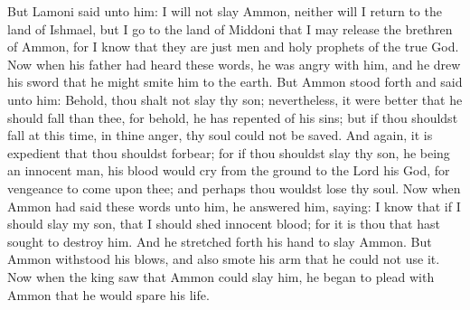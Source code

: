 But Lamoni said unto him: I will not slay Ammon, neither will I return to the land of Ishmael, but I go to the land of Middoni that I may release the brethren of Ammon, for I know that they are just men and holy prophets of the true God.
\bverse \iffalse Now when his father had heard these words, he was angry with him, and he drew his sword that he might smite him to the earth. \fi
Now when his father had heard these words, he was angry with him, and he drew his sword that he might smite him to the earth.
\bverse \iffalse But Ammon stood forth and said unto him: Behold, thou shalt not slay thy son; nevertheless, it were better that he should fall than thee, for behold, he has repented of his sins; but if thou shouldst fall at this time, in thine anger, thy soul could not be saved. \fi
But Ammon stood forth and said unto him: Behold, thou shalt not slay thy son; nevertheless, it were better that he should fall than thee, for behold, he has repented of his sins; but if thou shouldst fall at this time, in thine anger, thy soul could not be saved.
\bverse \iffalse And again, it is expedient that thou shouldst forbear; for if thou shouldst slay thy son, he being an innocent man, his blood would cry from the ground to the Lord his God, for vengeance to come upon thee; and perhaps thou wouldst lose thy soul. \fi
And again, it is expedient that thou shouldst forbear; for if thou shouldst slay thy son, he being an innocent man, his blood would cry from the ground to the Lord his God, for vengeance to come upon thee; and perhaps thou wouldst lose thy soul.
\bverse \iffalse Now when Ammon had said these words unto him, he answered him, saying: I know that if I should slay my son, that I should shed innocent blood; for it is thou that hast sought to destroy him. \fi
Now when Ammon had said these words unto him, he answered him, saying: I know that if I should slay my son, that I should shed innocent blood; for it is thou that hast sought to destroy him.
\bverse \iffalse And he stretched forth his hand to slay Ammon. But Ammon withstood his blows, and also smote his arm that he could not use it. \fi
And he stretched forth his hand to slay Ammon. But Ammon withstood his blows, and also smote his arm that he could not use it.
\bverse \iffalse Now when the king saw that Ammon could slay him, he began to plead with Ammon that he would spare his life. \fi
Now when the king saw that Ammon could slay him, he began to plead with Ammon that he would spare his life.
\bverse \iffalse But Ammon raised his sword, and said unto him: Behold, I will smite thee except thou wilt grant unto me that my brethren may be cast out of prison. \fi
